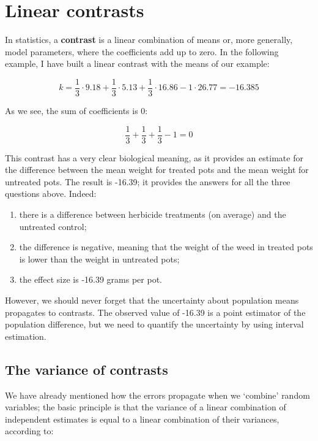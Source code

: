 \documentclass[a4paper,12pt,oneside]{book}
\providecommand{\tightlist}{%
  \setlength{\itemsep}{0pt}\setlength{\parskip}{0pt}}
\begin{document}
\hypertarget{linear-contrasts}{%
\section{Linear contrasts}\label{linear-contrasts}}

In statistics, a \textbf{contrast} is a linear combination of means or, more generally, model parameters, where the coefficients add up to zero. In the following example, I have built a linear contrast with the means of our example:

\[k = \frac{1}{3} \cdot 9.18 + \frac{1}{3} \cdot 5.13 + \frac{1}{3} \cdot 16.86 - 1 \cdot 26.77  = -16.385\]

As we see, the sum of coefficients is 0:

\[\frac{1}{3} + \frac{1}{3} + \frac{1}{3} - 1 = 0\]

This contrast has a very clear biological meaning, as it provides an estimate for the difference between the mean weight for treated pots and the mean weight for untreated pots. The result is -16.39; it provides the answers for all the three questions above. Indeed:

\begin{enumerate}
\def\labelenumi{\arabic{enumi}.}
\tightlist
\item
  there is a difference between herbicide treatments (on average) and the untreated control;
\item
  the difference is negative, meaning that the weight of the weed in treated pots is lower than the weight in untreated pots;
\item
  the effect size is -16.39 grams per pot.
\end{enumerate}

However, we should never forget that the uncertainty about population means propagates to contrasts. The observed value of -16.39 is a point estimator of the population difference, but we need to quantify the uncertainty by using interval estimation.

\hypertarget{the-variance-of-contrasts}{%
\subsection{The variance of contrasts}\label{the-variance-of-contrasts}}

We have already mentioned how the errors propagate when we `combine' random variables; the basic principle is that the variance of a linear combination of independent estimates is equal to a linear combination of their variances, according to:
\end{document}
